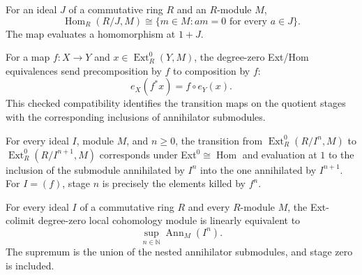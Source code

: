\begin{lemma}\label{lem:quotient-hom-annihilator}
For an ideal $J$ of a commutative ring $R$ and an $R$-module $M$,
\[
 \operatorname{Hom}_R(R/J,M)\cong
 \{m\in M: a m=0\text{ for every }a\in J\}.
\]
The map evaluates a homomorphism at $1+J$.
\leanok
\end{lemma}

\begin{lemma}\label{lem:ext-zero-naturality}
For a map $f:X\to Y$ and $x\in\operatorname{Ext}^0_R(Y,M)$, the degree-zero
Ext/Hom equivalences send precomposition by $f$ to composition by $f$:
\[
  e_X(f^*x)=f\circ e_Y(x).
\]
This checked compatibility identifies the transition maps on the quotient
stages with the corresponding inclusions of annihilator submodules.
\leanok
\end{lemma}

\begin{lemma}\label{lem:ext-zero-torsion-transition}
For every ideal $I$, module $M$, and $n\ge0$, the transition from
$\operatorname{Ext}^0_R(R/I^n,M)$ to $\operatorname{Ext}^0_R(R/I^{n+1},M)$
corresponds under Ext$^0\cong\operatorname{Hom}$ and evaluation at $1$ to the
inclusion of the submodule annihilated by $I^n$ into the one annihilated by
$I^{n+1}$. For $I=(f)$, stage $n$ is precisely the elements killed by $f^n$.
\leanok
\end{lemma}
\begin{lemma}\label{lem:ext-zero-power-torsion-sup}
For every ideal $I$ of a commutative ring $R$ and every $R$-module $M$, the
Ext-colimit degree-zero local cohomology module is linearly equivalent to
\[
  \sup_{n\in\mathbb N}\operatorname{Ann}_M(I^n).
\]
The supremum is the union of the nested annihilator submodules, and stage zero
is included.
\leanok
\end{lemma}

